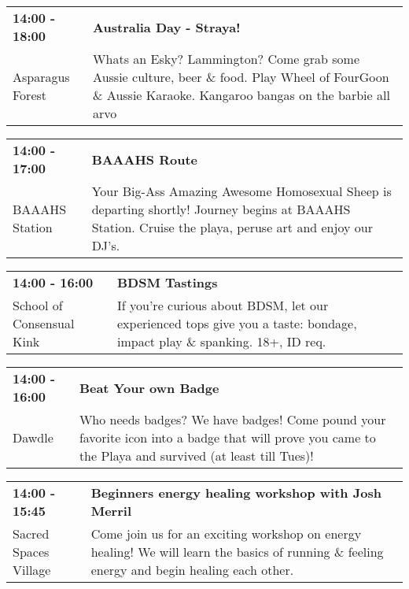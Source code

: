 \begin{tabular}{ p{1in} p{2.2in} }
    \textbf{14:00 - 18:00} & \textbf{Australia Day - Straya!} \\
    Asparagus Forest \newline  & Whats an Esky? Lammington? Come grab some Aussie culture, beer \& food. Play Wheel of FourGoon \& Aussie Karaoke. Kangaroo bangas on the barbie all arvo \\
    \hline 
\end{tabular}
    
\begin{tabular}{ p{1in} p{2.2in} }
    \textbf{14:00 - 17:00} & \textbf{BAAAHS Route} \\
    BAAAHS Station \newline  & Your Big-Ass Amazing Awesome Homosexual Sheep is departing shortly! Journey begins at BAAAHS Station. Cruise the playa, peruse art and enjoy our DJ's. \\
    \hline 
\end{tabular}
    
\begin{tabular}{ p{1in} p{2.2in} }
    \textbf{14:00 - 16:00} & \textbf{BDSM Tastings} \\
    School of Consensual Kink \newline  & If you're curious about BDSM, let our experienced tops give you a taste: bondage, impact play \& spanking. 18+, ID req. \\
    \hline 
\end{tabular}
    
\begin{tabular}{ p{1in} p{2.2in} }
    \textbf{14:00 - 16:00} & \textbf{Beat Your own Badge} \\
    Dawdle \newline  & Who needs badges? We have badges! Come pound your favorite icon into a badge that will prove you came to the Playa and survived (at least till Tues)! \\
    \hline 
\end{tabular}
    
\begin{tabular}{ p{1in} p{2.2in} }
    \textbf{14:00 - 15:45} & \textbf{Beginners energy healing workshop with Josh Merril} \\
    Sacred Spaces Village \newline  & Come join us for an exciting workshop on energy healing! We will learn the basics of running \& feeling energy and begin healing each other. \\
    \hline 
\end{tabular}
    
